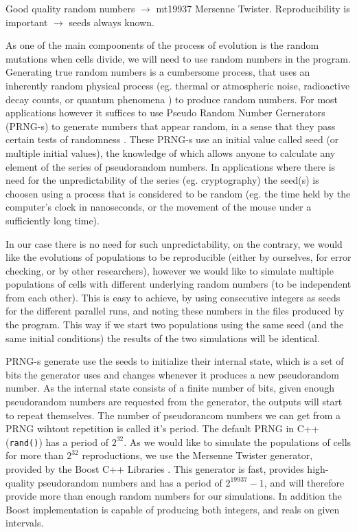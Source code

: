 \documentclass[10pt,a4paper]{article}
\begin{document}
Good quality random numbers $\rightarrow$ mt19937 Mersenne Twister. Reproducibility is important $\rightarrow$ seeds always known. 

As one of the main compoonents of the process of evolution is the random mutations when cells divide, we will need to use random numbers in the program. Generating true random numbers is a cumbersome process, that uses an inherently random physical process (eg. thermal or atmospheric noise, radioactive decay counts, or quantum phenomena \cite{truerandom}) to produce random numbers. For most applications however it suffices to use Pseudo Random Number Gernerators (PRNG-s) to generate numbers that appear random, in a sense that they pass certain tests of randomness \cite[]{randomtests}. These PRNG-s use an initial value called seed (or multiple initial values), the knowledge of which allows anyone to calculate any element of the series of pseudorandom numbers. In applications where there is need for the unpredictability of the series (eg. cryptography) the seed(s) is choosen using a process that is considered to be random (eg. the time held by the computer's clock in nanoseconds, or the movement of the mouse under a sufficiently long time).

In our case there is no need for such unpredictability, on the contrary, we would like the evolutions of populations to be reproducible (either by ourselves, for error checking, or by other researchers), however we would like to simulate multiple populations of cells with different underlying random numbers (to be independent from each other). This is easy to achieve, by using consecutive integers as seeds for the different parallel runs, and noting these numbers in the files produced by the program. This way if we start two populations using the same seed (and the same initial conditions) the results of the two simulations will be identical. 

PRNG-s generate use the seeds to initialize their internal state, which is a set of bits the generator uses and changes whenever it produces a new pseudorandom number. As the internal state consists of a finite number of bits, given enough pseudorandom numbers are requested from the generator, the outputs will start to repeat themselves. The number of pseudorancom numbers we can get from a PRNG wihtout repetition is called it's period. The default PRNG in C++ (\texttt{rand()}) has a period of $2^{32}$. As we would like to simulate the populations of cells for more than $2^{32}$ reproductions, we use the Mersenne Twister \cite{mersennetwister} generator, provided by the Boost C++ Libraries \cite{boostlibraries}. This generator is fast, provides high-quality pseudorandom numbers and has a period of $2^{19937}-1$, and will therefore provide more than enough random numbers for our simulations. In addition the Boost implementation is capable of producing both integers, and reals on given intervals. 
\end{document}
